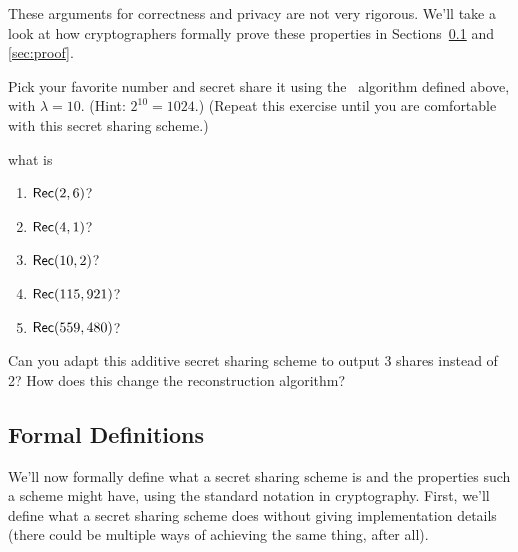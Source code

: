 These arguments for correctness and privacy are not very rigorous. We'll 
take a look at how cryptographers formally prove these properties in Sections~\ref{sec:formal-defs} 
and \ref{sec:proof}.

\begin{exercise}
    Pick your favorite number and secret share it using the \share~algorithm 
    defined above, with $\lambda=10$. (Hint: $2^{10}=1024$.)
    (Repeat this exercise until you are comfortable with this secret sharing 
    scheme.)
\end{exercise}

\begin{exercise}
     what is
    \renewcommand{\labelenumi}{(\alph{enumi})} 
    \begin{enumerate}%
        \item $\mathsf{Rec}(2, 6)$?
        \item $\mathsf{Rec}(4, 1)$?
        \item $\mathsf{Rec}(10, 2)$?
        \item $\mathsf{Rec}(115, 921)$?
        \item $\mathsf{Rec}(559, 480)$?
    \end{enumerate}
\end{exercise}

\begin{exercise}
    Can you adapt this additive secret sharing scheme to output 
    3 shares instead of 2? How does this change the reconstruction 
    algorithm?
\end{exercise}

\subsection[Formal Definitions*]{Formal Definitions}\label{sec:formal-defs}

We'll now formally define what a secret sharing scheme is and the 
properties such a scheme might have, using the standard notation in 
cryptography. First, we'll define what a secret sharing scheme 
does without giving implementation details (there could be multiple ways 
of achieving the same thing, after all). 

